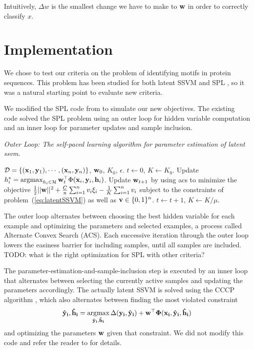 \documentclass{article}
\newcommand{\mysection}[1]{\vspace{-4mm}\section{#1}\vspace{-4mm}}
\newcommand{\mytopcaption}[1]{\caption{\em \footnotesize #1}}
\newcommand{\argmax}{\operatornamewithlimits{argmax}}
\newcommand{\mthb }{\begin{eqnarray*} }
\newcommand{\mthe }{\end {eqnarray*} }
\begin{document}
Intuitively, $\Delta w$ is the smallest change we have to make to $\bf w$ in order to correctly classify $x$.  


\mysection{Implementation}
\label{sec:Implementation}
We chose to test our criteria on the problem of identifying motifs in protein sequences.  This problem has been studied for both latent SSVM \cite{SSVM} and SPL \cite{SPL}, so it was a natural starting point to evaluate new criteria.

We modified the SPL code from \cite{SPL} to simulate our new objectives. The existing code solved the SPL problem using an outer loop for hidden variable computation and an inner loop for parameter updates and sample inclusion.

\begin{algorithm}[h!]
\mytopcaption{Outer Loop: The self-paced learning algorithm for parameter estimation of latent {\sc ssvm}.}
\label{algo:selfPacedLatentSSVM}
\begin{algorithmic}[1]
\INPUT ${\cal D} = \{({\bf x}_1,{\bf y}_1),\cdots,({\bf x}_n,{\bf y}_n)\}$, ${\bf w}_0$, $K_0$, $\epsilon$.
\STATE $t \leftarrow 0$, $K \leftarrow K_0$.
\REPEAT
\STATE Update $h_i^* = \argmax_{h_i \in {\cal H}} {\bf w}_{t}^\top \Phi({\bf x}_i,{\bf y}_i,{\bf h}_i)$.
\STATE Update ${\bf w}_{t+1}$ by using {\sc acs} to minimize the objective
$\frac{1}{2}||{\bf w}||^2 + \frac{C}{n} \sum_{i=1}^n v_i\xi_i - \frac{1}{K} \sum_{i=1}^n v_i$ subject to the
constraints of problem~(\ref{eq:latentSSVM}) as
well as ${\bf v} \in \{0,1\}^n$.
\STATE $t \leftarrow t + 1$, $K \leftarrow K/\mu$.
\end{algorithmic}
\end{algorithm}

The outer loop alternates between choosing the best hidden variable for each example and optimizing the parameters and selected examples, a process called Alternate Convex Search (ACS).  Each successive iteration through the outer loop lowers the easiness barrier for including samples, until all samples are included. TODO: what is the right optimization for SPL with other criteria?

The parameter-estimation-and-sample-inclusion step is executed by an inner loop that alternates between selecting the currently active samples and updating the parameters accordingly.  The actually latent SSVM is solved using the {\sc CCCP} algorithm \cite{SSVM}, which also alternates between finding the most violated constraint
\mthb
{\bf\hat y_i,\bf\hat h_i} = \argmax_{{\bf\hat y_i},{\bf\hat h_i}} \Delta(\bf y_i,\bf\hat y_i)+\bf w^\top\Phi(\bf x_i,\bf\hat y_i,\bf\hat h_i)
\mthe
and optimizing the parameters $\bf w$ given that constraint.  We did not modify this code and refer the reader to \cite{SSVM} for details.
\end{document}

